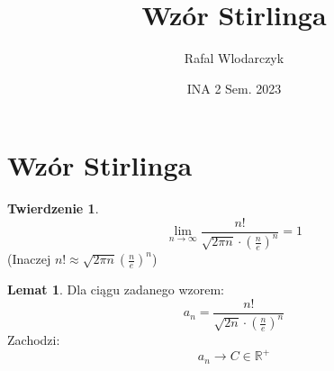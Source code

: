 \documentclass{article}
\author{Rafal Wlodarczyk}
\title{Wzór Stirlinga}
\date{INA 2 Sem. 2023}
\theoremstyle{definition}
\theoremstyle{definition}
\theoremstyle{definition}
\newtheorem{tw}{Twierdzenie}[subsection]
\theoremstyle{definition}
\newtheorem{lemat}{Lemat}[subsection]
\theoremstyle{definition}
\theoremstyle{definition}
\begin{document}
\maketitle

\section{Wzór Stirlinga}

\begin{tw}
    \[\lim_{n\rightarrow \infty} \frac{n!}{\sqrt{2\pi n} \cdot \left(\frac{n}{e}\right)^n} = 1\]
    (Inaczej $n! \approx \sqrt{2\pi n} \left(\frac{n}{e}\right)^n$)
\end{tw}

\begin{lemat}
    Dla ciągu zadanego wzorem:
    \[a_n = \frac{n!}{\sqrt{2n} \cdot \left(\frac{n}{e}\right)^n}\]
    Zachodzi:
    \[a_n \rightarrow C \in \mathbb{R}^{+}\]
\end{lemat}
\end{document}
